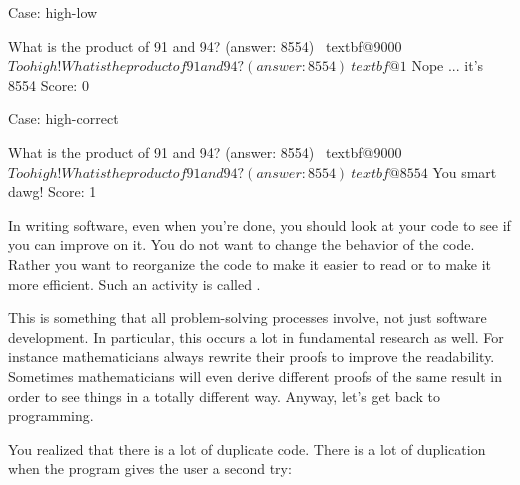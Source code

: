 Case: high-low\\
\begin{console}[commandchars=\~\@\$]
What is the product of 91 and 94? (answer: 8554) ~textbf@9000$
Too high!
What is the product of 91 and 94? (answer: 8554) ~textbf@1$
Nope ... it's 8554
Score: 0
\end{console}

Case: high-correct\\
\begin{console}[commandchars=\~\@\$]
What is the product of 91 and 94? (answer: 8554) ~textbf@9000$
Too high!
What is the product of 91 and 94? (answer: 8554) ~textbf@8554$
You smart dawg!
Score: 1
\end{console}


\newpage{}

In writing software, even when you're done, you should
look at your code to see if you can improve on it. You do not want to
change the behavior of the code. Rather you want to reorganize the code
to make it easier to read or to make it more efficient. Such an activity
is called .

This is something that all problem-solving processes involve, not just
software development. In particular, this occurs a lot in fundamental
research as well. For instance mathematicians always rewrite their
proofs to improve the readability. Sometimes mathematicians will even
derive different proofs of the same result in order to see things in a
totally different way. Anyway, let's get back to
programming.

You realized that there is a lot of duplicate code. There is a lot of
duplication when the program gives the user a second try:

